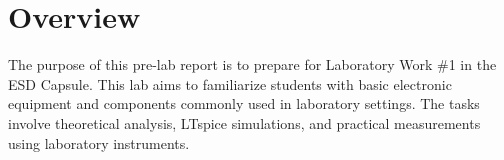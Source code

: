 \chapter{Overview}

The purpose of this pre-lab report is to prepare for Laboratory Work \#1 in the ESD Capsule. This lab aims to familiarize students with basic electronic equipment and components commonly used in laboratory settings. The tasks involve theoretical analysis, LTspice simulations, and practical measurements using laboratory instruments.
